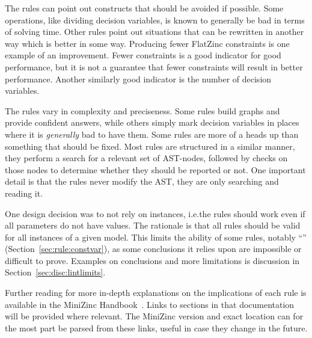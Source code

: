 \documentclass[a4paper,12pt]{article}
\newcommand{\ruleref}[1]{``\nameref{sec:rule:#1}'' (Section~\ref{sec:rule:#1})}
\begin{document}

The rules can point out constructs that should be avoided if possible. Some operations,
like dividing decision variables, is known to generally be bad in terms of solving time.
Other rules point out situations that can be rewritten in another way which is better in
some way. Producing fewer FlatZinc constraints is one example of an improvement. Fewer
constraints is a good indicator for good performance, but it is not a guarantee that fewer
constraints will result in better performance. Another similarly good indicator is the
number of decision variables.

The rules vary in complexity and preciseness. Some rules build graphs and provide
confident answers, while others simply mark decision variables in places where it is
\emph{generally} bad to have them. Some rules are more of a heads up than something that
should be fixed. Most rules are structured in a similar manner, they perform a search for
a relevant set of AST-nodes, followed by checks on those nodes to determine whether they
should be reported or not. One important detail is that the rules never modify the AST, they
are only searching and reading it.

One design decision was to not rely on instances, i.e.\@ the rules should work even if all
parameters do not have values. The rationale is that all rules should be valid for all
instances of a given model. This limits the ability of some rules, notably
\ruleref{constvar}, as some conclusions it relies upon are impossible or difficult to prove.
Examples on conclusions and more limitations is discussion in Section~\ref{sec:disc:lintlimits}.

Further reading for more in-depth explanations on the implications of each rule is
available in the MiniZinc Handbook~\cite{mznbook}. Links to sections in that documentation
will be provided where relevant. The MiniZinc version and exact location can for the most
part be parsed from these links, useful in case they change in the future.
\end{document}
